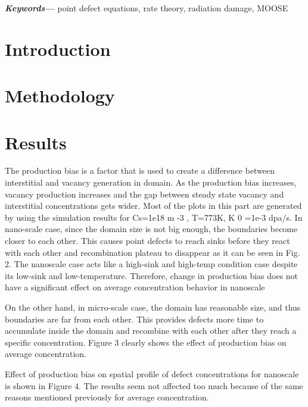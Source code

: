 \documentclass[a4paper]{article}
\providecommand{\keywords}[1]
{
  \small
  \textbf{\textit{Keywords---}} #1
}
\begin{document}
\keywords{point defect equations, rate theory, radiation damage, MOOSE}

% 

\section{Introduction} \hspace{10pt}

\section{Methodology} \hspace{10pt}

\section{Results} \hspace{10pt}


The production bias is a factor that is used to create a difference between interstitial
and vacancy generation in domain. As the production bias increases, vacancy production
increases and the gap between steady state vacancy and interstitial concentrations gets wider.
Most of the plots in this part are generated by using the simulation results for Cs=1e18 m -3 ,
T=773K, K 0 =1e-3 dpa/s.
In nano-scale case, since the domain size is not big enough, the boundaries become
closer to each other. This causes point defects to reach sinks before they react with each other
and recombination plateau to disappear as it can be seen in Fig. 2. The nanoscale case acts like
a high-sink and high-temp condition case despite its low-sink and low-temperature. Therefore,
change in production bias does not have a significant effect on average concentration behavior
in nanoscale

On the other hand, in micro-scale case, the domain has reasonable size, and thus
boundaries are far from each other. This provides defects more time to accumulate inside the
domain and recombine with each other after they reach a specific concentration. Figure 3
clearly shows the effect of production bias on average concentration.

Effect of production bias on spatial profile of defect concentrations for nanoscale is
shown in Figure 4. The results seem not affected too much because of the same reasons
mentioned previously for average concentration.
\end{document}
